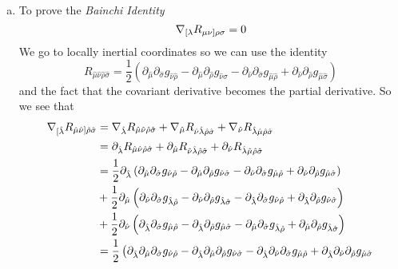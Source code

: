 \documentclass[11pt]{article}
\numberwithin{equation}{section}
\begin{document}
\begin{enumerate}[(a)]
\item
To prove the \emph{Bainchi Identity}
\begin{equation}
\bold\nabla_{[\lambda}R_{\mu\nu]\rho\sigma} = 0
\label{Bainchi}
\end{equation}
We go to locally inertial coordinates so we can use the identity 
$$R_{\hat{\mu}\hat{\nu}\hat{\rho}\hat{\sigma}} = \frac{1}{2}\left(\partial_{\hat{\mu}}\partial_{\hat{\sigma}}g_{\hat{\nu}\hat{\rho}} - \partial_{\hat{\mu}}\partial_{\hat{\rho}}g_{\hat{\nu}\hat{\sigma}} - \partial_{\hat{\nu}}\partial_{\hat{\sigma}}g_{\hat{\mu}\hat{\rho}} + \partial_{\hat{\nu}}\partial_{\hat{\rho}}g_{\hat{\mu}\hat{\sigma}}\right)$$
and the fact that the covariant derivative becomes the partial derivative. So we see that
\begin{align*}
\grad_{[\hat{\lambda}}R_{\hat{\mu}\hat{\nu}]\hat{\rho}\hat{\sigma}} &= \grad_{\hat{\lambda}}R_{\hat{\mu}\hat{\nu}\hat{\rho}\hat{\sigma}} + \grad_{\hat{\mu}}R_{\hat{\nu}\hat{\lambda}\hat{\rho}\hat{\sigma}} + \grad_{\hat{\nu}}R_{\hat{\lambda}\hat{\mu}\hat{\rho}\hat{\sigma}}\\ 
&= \partial_{\hat{\lambda}}R_{\hat{\mu}\hat{\nu}\hat{\rho}\hat{\sigma}} + \partial_{\hat{\mu}}R_{\hat{\nu}\hat{\lambda}\hat{\rho}\hat{\sigma}} + \partial_{\hat{\nu}}R_{\hat{\lambda}\hat{\mu}\hat{\rho}\hat{\sigma}}\\ 
&= \frac{1}{2}\partial_{\hat{\lambda}}\left(\partial_{\hat{\mu}}\partial_{\hat{\sigma}}g_{\hat{\nu}\hat{\rho}} - \partial_{\hat{\mu}}\partial_{\hat{\rho}}g_{\hat{\nu}\hat{\sigma}} - \partial_{\hat{\nu}}\partial_{\hat{\sigma}}g_{\hat{\mu}\hat{\rho}} + \partial_{\hat{\nu}}\partial_{\hat{\rho}}g_{\hat{\mu}\hat{\sigma}}\right)\\
&+ \frac{1}{2}\partial_{\hat{\mu}}\left(\partial_{\hat{\nu}}\partial_{\hat{\sigma}}g_{\hat{\lambda}\hat{\rho}} - \partial_{\hat{\nu}}\partial_{\hat{\rho}}g_{\hat{\lambda}\hat{\sigma}} - \partial_{\hat{\lambda}}\partial_{\hat{\sigma}}g_{\hat{\nu}\hat{\rho}} + \partial_{\hat{\lambda}}\partial_{\hat{\rho}}g_{\hat{\nu}\hat{\sigma}}\right)\\
&+ \frac{1}{2}\partial_{\hat{\nu}}\left(\partial_{\hat{\lambda}}\partial_{\hat{\sigma}}g_{\hat{\mu}\hat{\rho}} - \partial_{\hat{\lambda}}\partial_{\hat{\rho}}g_{\hat{\mu}\hat{\sigma}} - \partial_{\hat{\mu}}\partial_{\hat{\sigma}}g_{\hat{\lambda}\hat{\rho}} + \partial_{\hat{\mu}}\partial_{\hat{\rho}}g_{\hat{\lambda}\hat{\sigma}}\right)\\
&= \frac{1}{2}\left(\partial_{\hat{\lambda}}\partial_{\hat{\mu}}\partial_{\hat{\sigma}}g_{\hat{\nu}\hat{\rho}} - \partial_{\hat{\lambda}}\partial_{\hat{\mu}}\partial_{\hat{\rho}}g_{\hat{\nu}\hat{\sigma}} - \partial_{\hat{\lambda}}\partial_{\hat{\nu}}\partial_{\hat{\sigma}}g_{\hat{\mu}\hat{\rho}} + \partial_{\hat{\lambda}}\partial_{\hat{\nu}}\partial_{\hat{\rho}}g_{\hat{\mu}\hat{\sigma}}\right.\\

\end{align*}
\end{enumerate}
\end{document}
